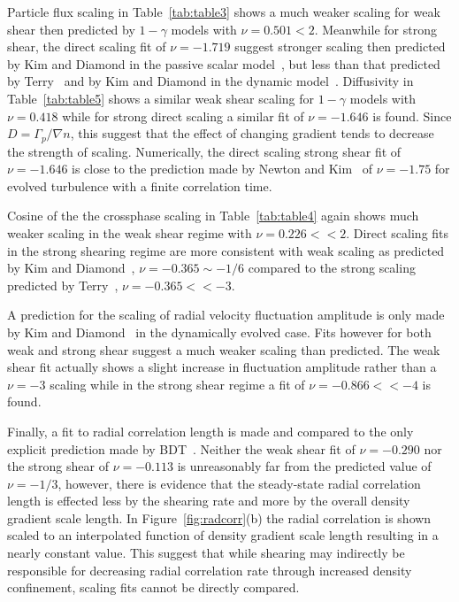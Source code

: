 \documentclass[aip,pop,amsmath,amssymb,preprint,superscriptaddress]{revtex4-1} %
\begin{document}
Particle flux scaling in Table~\ref{tab:table3} shows a much weaker scaling for weak shear then predicted by $1-\gamma$ models with $\nu = 0.501 < 2$. Meanwhile for strong shear, the direct scaling fit of $\nu = -1.719$ suggest stronger scaling then predicted by Kim and Diamond in the passive scalar model~\cite{kim03}, but less than that predicted by Terry~\cite{terry01} and by Kim and Diamond in the dynamic model~\cite{kim04}. Diffusivity in Table~\ref{tab:table5} shows a similar weak shear scaling for $1-\gamma$ models with $\nu = 0.418$ while for strong direct scaling a similar fit of $\nu = -1.646$ is found. Since $D=\Gamma_p/\nabla n$, this suggest that the effect of changing gradient tends to decrease the strength of scaling. Numerically, the direct scaling strong shear fit of $\nu = -1.646$ is close to the prediction made by Newton and Kim~\cite{newton11} of $\nu = -1.75$ for evolved turbulence with a finite correlation time.

Cosine of the the crossphase scaling in Table~\ref{tab:table4} again shows much weaker scaling in the weak shear regime with $\nu = 0.226 << 2$. Direct scaling fits in the strong shearing regime are more consistent with weak scaling as predicted by Kim and Diamond~\cite{kim03,kim04}, $\nu = -0.365 \sim -1/6$ compared to the strong scaling predicted by Terry~\cite{terry01}, $\nu = -0.365 << -3$.

A prediction for the scaling of radial velocity fluctuation amplitude is only made by Kim and Diamond~\cite{kim04} in the dynamically evolved case. Fits however for both weak and strong shear suggest a much weaker scaling than predicted. The weak shear fit actually shows a slight increase in fluctuation amplitude rather than a $\nu = -3$ scaling while in the strong shear regime a fit of $\nu = -0.866 << -4$ is found.

Finally, a fit to radial correlation length is made and compared to the only explicit prediction made by BDT~\cite{biglari90}. Neither the weak shear fit of $\nu = -0.290$ nor the strong shear of $\nu = -0.113$ is unreasonably far from the predicted value of $\nu = -1/3$, however, there is evidence that the steady-state radial correlation length is effected less by the shearing rate and more by the overall density gradient scale length. In Figure~\ref{fig:radcorr}(b) the radial correlation is shown scaled to an interpolated function of density gradient scale length resulting in a nearly constant value. This suggest that while shearing may indirectly be responsible for decreasing radial correlation rate through increased density confinement, scaling fits cannot be directly compared.
\end{document}
